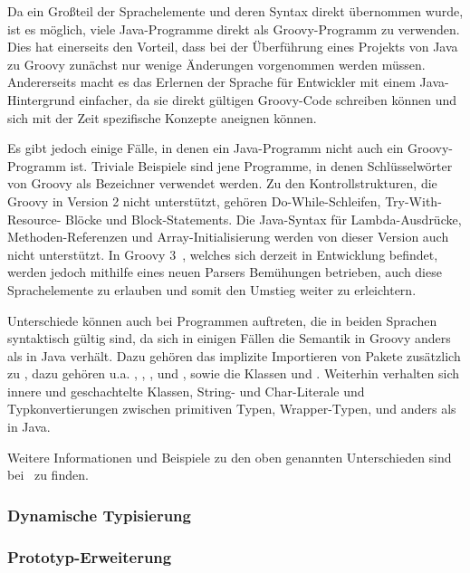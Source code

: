 	Da ein Großteil der Sprachelemente und deren Syntax direkt übernommen wurde, ist es möglich, viele Java-Programme direkt als Groovy-Programm zu verwenden.
	Dies hat einerseits den Vorteil, dass bei der Überführung eines Projekts von Java zu Groovy zunächst nur wenige Änderungen vorgenommen werden müssen.
	Andererseits macht es das Erlernen der Sprache für Entwickler mit einem Java-Hintergrund einfacher, da sie direkt gültigen Groovy-Code schreiben können und sich mit der Zeit spezifische Konzepte aneignen können.

	Es gibt jedoch einige Fälle, in denen ein Java-Programm nicht auch ein Groovy-Programm ist.
	Triviale Beispiele sind jene Programme, in denen Schlüsselwörter von Groovy als Bezeichner verwendet werden.
	Zu den Kontrollstrukturen, die Groovy in Version 2 nicht unterstützt, gehören Do-While-Schleifen, Try-With-Resource- Blöcke und Block-Statements.
	Die Java-Syntax für Lambda-Ausdrücke, Methoden-Referenzen und Array-Initialisierung werden von dieser Version auch nicht unterstützt.
	In Groovy 3~\cite{groovy-lang:release3}, welches sich derzeit in Entwicklung befindet, werden jedoch mithilfe eines neuen Parsers Bemühungen betrieben, auch diese Sprachelemente zu erlauben und somit den Umstieg weiter zu erleichtern.

	Unterschiede können auch bei Programmen auftreten, die in beiden Sprachen syntaktisch gültig sind, da sich in einigen Fällen die Semantik in Groovy anders als in Java verhält.
	Dazu gehören das implizite Importieren von Pakete zusätzlich zu , dazu gehören {u.a.} , , ,  und , sowie die Klassen  und .
	Weiterhin verhalten sich innere und geschachtelte Klassen, String- und Char-Literale und Typkonvertierungen zwischen primitiven Typen, Wrapper-Typen,  und  anders als in Java.

	Weitere Informationen und Beispiele zu den oben genannten Unterschieden sind bei~\cite{groovy-lang:differences} zu finden.

	\subsubsection{Dynamische Typisierung}\label{subsubsec:dynamische-typisierung}

	\subsubsection{Prototyp-Erweiterung}

